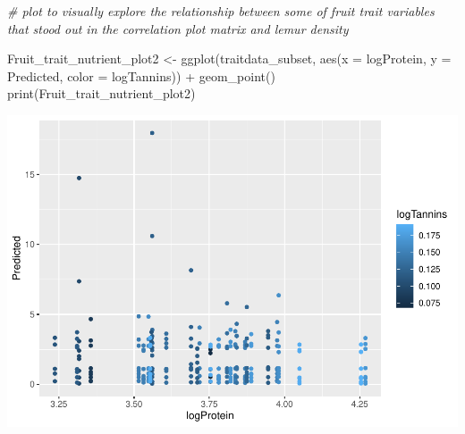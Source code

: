 \documentclass[
  12pt,
]{article}
\newenvironment{Shaded}{\begin{snugshade}}{\end{snugshade}}
\newcommand{\AttributeTok}[1]{\textcolor[rgb]{0.77,0.63,0.00}{#1}}
\newcommand{\CommentTok}[1]{\textcolor[rgb]{0.56,0.35,0.01}{\textit{#1}}}
\newcommand{\FunctionTok}[1]{\textcolor[rgb]{0.00,0.00,0.00}{#1}}
\newcommand{\NormalTok}[1]{#1}
\newcommand{\OtherTok}[1]{\textcolor[rgb]{0.56,0.35,0.01}{#1}}
\newcommand{\SpecialCharTok}[1]{\textcolor[rgb]{0.00,0.00,0.00}{#1}}
\begin{document}
\begin{Shaded}
\begin{Highlighting}[]
\CommentTok{\# plot to visually explore the relationship between some of fruit trait variables that stood out in the correlation plot matrix and lemur density}

\NormalTok{Fruit\_trait\_nutrient\_plot2 }\OtherTok{\textless{}{-}} \FunctionTok{ggplot}\NormalTok{(traitdata\_subset, }\FunctionTok{aes}\NormalTok{(}\AttributeTok{x =}\NormalTok{ logProtein, }\AttributeTok{y =}\NormalTok{ Predicted, }\AttributeTok{color =}\NormalTok{ logTannins)) }\SpecialCharTok{+}
  \FunctionTok{geom\_point}\NormalTok{()}
\FunctionTok{print}\NormalTok{(Fruit\_trait\_nutrient\_plot2)}
\end{Highlighting}
\end{Shaded}

\includegraphics{project_draft_files/figure-latex/unnamed-chunk-4-3.pdf}
\end{document}

